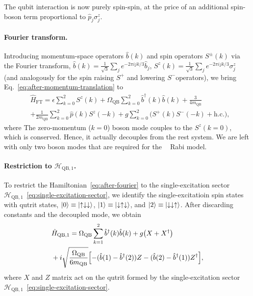 \documentclass[reprint, aps, prx, amsmath, amssymb, longbibliography, superscriptaddress]{revtex4-2}
\DeclareMathOperator{\Zthree}{\mathbb{Z}_3}
\begin{document}
The qubit interaction is now purely spin-spin, at the price of an additional
spin-boson term proportional to $\hat p_j \sigma_j^z$.

\paragraph{Fourier transform.}
Introducing momentum-space operators $\hat b(k)$ and spin operators $S^{\pm}(k)$ via the Fourier transform, $\hat b(k)= \tfrac{1}{\sqrt{3}}\sum_{j}e^{-2\pi i jk/3}\hat b_j$, $ S^z(k)= \tfrac{1}{\sqrt{3}}\sum_{j}e^{-2\pi i jk/3}\sigma_j^z$ (and analogously for the spin raising $S^+$ and lowering $S^-$operators), we
bring Eq.~\eqref{eq:after-momentum-translation} to
\begin{equation}
\label{eq:after-fourier}
  \begin{aligned}
    &\hat H_{\text{FT}} = \epsilon \sum_{k=0}^{2} S^{z}(k)
      + \Omega_{\text{QB}} \sum_{k=0}^{2} \hat b^{\dagger}(k) \hat b(k)
                         + \frac{3}{4 m_{\text{QB}}} \\
     &+\frac{1}{2 m_{\text{QB}}} \sum_{k=0}^{2} \hat p(k) S^{z}(-k)
            + g \sum_{k=0}^{2} \bigl( S^{+}(k) S^{-}(-k) + \text{h.c.} \bigr),
  \end{aligned}
\end{equation}
where The zero-momentum ($k=0$) boson mode
couples to the $S^z(k=0)$, which is conserved. Hence, it actually decouples from the rest system. We are left with only two boson modes that are required for the $\Zthree$ Rabi model.

\paragraph{Restriction to $\mathcal H_{\text{QB},1}$.}
To restrict the Hamiltonian~\eqref{eq:after-fourier} to the single-excitation sector $\mathcal{H}_{\text{QB},1}$~\eqref{eq:single-excitation-sector}, we identify the single-excitatioin spin states with qutrit states, $\ket{0} \equiv \ket{\uparrow\downarrow\downarrow}$, $ \ket{1} \equiv \ket{\downarrow\uparrow\downarrow}$, and $ \ket{2} \equiv \ket{\downarrow\downarrow\uparrow} $. After discarding constants and the decoupled mode, we obtain
\begin{equation}
  \begin{aligned}
    &\hat H_{\text{QB},1} = \Omega_{\text{QB}} \sum_{k=1}^{2} \hat b^{\dagger}(k)
      \hat b(k) + g \bigl( X + X^{\dagger} \bigr)
      \\
      &+ i \sqrt{ \frac{\Omega_{\text{QB}}}{6 m_{\text{QB}}} }
        \Bigl[ -( \hat b(1) - \hat b^{\dagger}(2) ) Z
        - ( \hat b(2) - \hat b^{\dagger}(1) ) Z^{\dagger} \Bigr],
  \end{aligned}
\end{equation}
where $X$ and $Z$ matrix act on the qutrit formed by the single-excitation sector $\mathcal{H}_{\text{QB},1}$~\eqref{eq:single-excitation-sector}.
\end{document}
